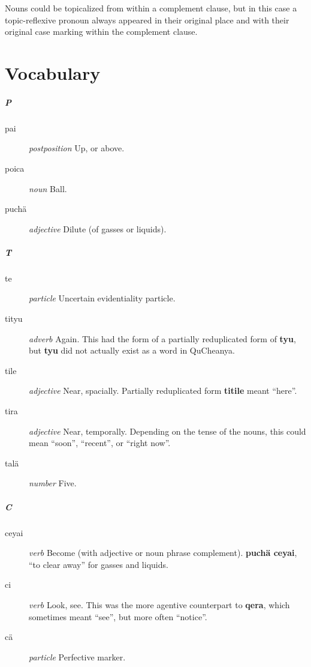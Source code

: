 \documentclass{article}
\begin{document}
Nouns could be topicalized from within a complement clause, but in this case a topic-reflexive pronoun always appeared in their original place and with their original case marking within the complement clause.

\part{Vocabulary}

\subsubsection{P}

\begin{description}
\item [pai] \emph{postposition} Up, or above.
\item [poica] \emph{noun} Ball.
\item [puch\"a] \emph{adjective} Dilute (of gasses or liquids).
\end{description}

\subsubsection{T}

\begin{description}
\item [te] \emph{particle} Uncertain evidentiality particle.
\item [tityu] \emph{adverb} Again.  This had the form of a partially reduplicated form of \textbf{tyu}, but \textbf{tyu} did not actually exist as a word in QuCheanya.
\item [tile] \emph{adjective} Near, spacially.  Partially reduplicated form \textbf{titile} meant ``here''.
\item [tira] \emph{adjective} Near, temporally.  Depending on the tense of the nouns, this could mean ``soon'', ``recent'', or ``right now''.
\item [tal\"a] \emph{number} Five.
\end{description}

\subsubsection{C}

\begin{description}
\item [ceyai] \emph{verb} Become (with adjective or noun phrase complement). \textbf{puch\"a ceyai}, ``to clear away'' for gasses and liquids.
\item [ci] \emph{verb} Look, see.  This was the more agentive counterpart to \textbf{qera}, which sometimes meant ``see'', but more often ``notice''.
\item [c\"a] \emph{particle} Perfective marker.
\end{description}
\end{document}

